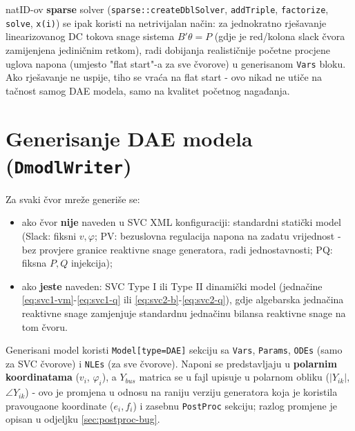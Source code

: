 \documentclass[11pt,a4paper]{report}
\begin{document}
natID-ov \textbf{sparse} solver (\texttt{sparse::createDblSolver}, \texttt{addTriple},
\texttt{factorize}, \texttt{solve}, \texttt{x(i)}) se ipak koristi na netrivijalan način:
za jednokratno rješavanje linearizovanog DC tokova snage sistema $B' \theta = P$ (gdje je
red/kolona slack čvora zamijenjena jediničnim retkom), radi dobijanja realističnije
početne procjene uglova napona (umjesto "flat start"-a za sve čvorove) u generisanom
\texttt{Vars} bloku. Ako rješavanje ne uspije, tiho se vraća na flat start - ovo nikad ne
utiče na tačnost samog DAE modela, samo na kvalitet početnog nagađanja.

\section{Generisanje DAE modela (\texttt{DmodlWriter})}

Za svaki čvor mreže generiše se:
\begin{itemize}
    \item ako čvor \textbf{nije} naveden u SVC XML konfiguraciji: standardni statički
        model (Slack: fiksni $v,\varphi$; PV: bezuslovna regulacija napona na zadatu
        vrijednost - bez provjere granice reaktivne snage generatora, radi jednostavnosti;
        PQ: fiksna $P,Q$ injekcija);
    \item ako \textbf{jeste} naveden: SVC Type I ili Type II dinamički model (jednačine
        \ref{eq:svc1-vm}-\ref{eq:svc1-q} ili \ref{eq:svc2-b}-\ref{eq:svc2-q}), gdje
        algebarska jednačina reaktivne snage zamjenjuje standardnu jednačinu bilansa
        reaktivne snage na tom čvoru.
\end{itemize}

Generisani model koristi \texttt{Model[type=DAE]} sekciju sa \texttt{Vars}, \texttt{Params},
\texttt{ODEs} (samo za SVC čvorove) i \texttt{NLEs} (za sve čvorove). Naponi se
predstavljaju u \textbf{polarnim koordinatama} ($v_i$, $\varphi_i$), a $Y_{bus}$ matrica se
u fajl upisuje u polarnom obliku ($|Y_{ik}|$, $\angle Y_{ik}$) - ovo je promjena u odnosu
na raniju verziju generatora koja je koristila pravougaone koordinate ($e_i,f_i$) i
zasebnu \texttt{PostProc} sekciju; razlog promjene je opisan u odjeljku
\ref{sec:postproc-bug}.
\end{document}
